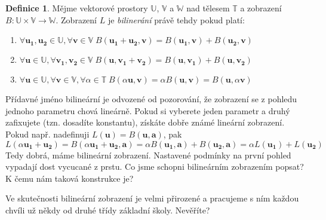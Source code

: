 \documentclass[a5paper,12pt]{amsbook}
\theoremstyle{definition}
\newtheorem{definition}{Definice}[chapter]
\newcommand{\myscalar}[1]{#1}
\newcommand{\myvec}[1]{\bm{#1}}
\newcommand{\myspace}[1]{\mathbb{#1}}
\newcommand{\mymap}[1]{#1}
\begin{document}
\begin{definition}
Mějme vektorové prostory $\myspace{U}$, $\myspace{V}$ a $\myspace{W}$ nad tělesem $\myspace{T}$
a zobrazení $\mymap{B}: \myspace{U}\times\myspace{V}\rightarrow\myspace{W}$. Zobrazení $\mymap{L}$ je
\textit{bilinerání} právě tehdy pokud platí:

\begin{enumerate}
  \item $\forall\myvec{u_1},\myvec{u_2}\in\myspace{U},\forall\myvec{v}\in\myspace{V}\;
    \mymap{B}(\myvec{u_1} + \myvec{u_2}, \myvec{v}) = \mymap{B}(\myvec{u_1}, \myvec{v}) + \mymap{B}(\myvec{u_2}, \myvec{v})$
  \item $\forall\myvec{u}\in\myspace{U},\forall\myvec{v_1},\myvec{v_2}\in\myspace{V}\;
    \mymap{B}(\myvec{u}, \myvec{v_1} + \myvec{v_2}) = \mymap{B}(\myvec{u}, \myvec{v_1}) + \mymap{B}(\myvec{u}, \myvec{v_2})$
  \item $\forall\myvec{u}\in\myspace{U},\forall\myvec{v}\in\myspace{V},\forall\myscalar{\alpha}\in\myspace{T}\;
    \mymap{B}(\myscalar{\alpha}\myvec{u}, \myvec{v}) = \myscalar{\alpha}\mymap{B}(\myvec{u}, \myvec{v}) =
      \mymap{B}(\myvec{u}, \myscalar{\alpha}\myvec{v})$
\end{enumerate}

\end{definition}

\noindent
Přídavné jméno bilineární je odvozené od pozorování, že zobrazení se z pohledu jednoho parametru chová lineárně.
Pokud si vyberete jeden parametr a druhý zafixujete (tzn. dosadíte konstantu), získáte dobře známé lineární
zobrazení. Pokud např. nadefinuji $\mymap{L}(\myvec{u}) = \mymap{B}(\myvec{u}, \myvec{a})$, pak
\begin{equation*}
\mymap{L}(\myscalar{\alpha}\myvec{u_1} + \myvec{u_2}) = \mymap{B}(\myscalar{\alpha}\myvec{u_1} + \myvec{u_2}, \myvec{a})
  = \myscalar{\alpha}\mymap{B}(\myvec{u_1}, \myvec{a}) + \mymap{B}(\myvec{u_2}, \myvec{a})
  = \myscalar{\alpha}\mymap{L}(\myvec{u_1}) + \mymap{L}(\myvec{u_2})
\end{equation*}
Tedy dobrá, máme bilineární zobrazení. Nastavené podmínky na první pohled vypadají dost vycucané z prstu.
Co jsme schopni bilineárním zobrazením popsat? K čemu nám taková konstrukce je?

Ve skutečnosti bilineární zobrazení je velmi přirozené a pracujeme s ním každou chvíli už někdy od druhé třídy
základní školy. Nevěříte?
\end{document}
